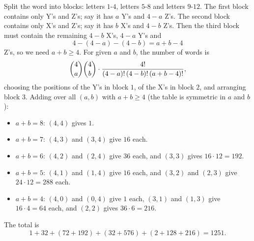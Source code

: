 Split the word into blocks: letters $1$-$4$, letters $5$-$8$ and letters $9$-$12$. The first block contains only Y's and Z's; say it has $a$ Y's and $4-a$ Z's. The second block contains only X's and Z's; say it has $b$ X's and $4-b$ Z's. Then the third block must contain the remaining $4-b$ X's, $4-a$ Y's and
\[4-(4-a)-(4-b)=a+b-4\]
Z's, so we need $a+b\ge4$. For given $a$ and $b$, the number of words is
\[\dbinom4a\dbinom4b\cdot\dfrac{4!}{(4-a)!\,(4-b)!\,(a+b-4)!},\]
choosing the positions of the Y's in block $1$, of the X's in block $2$, and arranging block $3$. Adding over all $(a,b)$ with $a+b\ge4$ (the table is symmetric in $a$ and $b$):
\begin{itemize}
\item $a+b=8$: $(4,4)$ gives $1$.
\item $a+b=7$: $(4,3)$ and $(3,4)$ give $16$ each.
\item $a+b=6$: $(4,2)$ and $(2,4)$ give $36$ each, and $(3,3)$ gives $16\cdot12=192$.
\item $a+b=5$: $(4,1)$ and $(1,4)$ give $16$ each, and $(3,2)$ and $(2,3)$ give $24\cdot12=288$ each.
\item $a+b=4$: $(4,0)$ and $(0,4)$ give $1$ each, $(3,1)$ and $(1,3)$ give $16\cdot4=64$ each, and $(2,2)$ gives $36\cdot6=216$.
\end{itemize}
The total is
\[1+32+(72+192)+(32+576)+(2+128+216)=\boxed{1251}.\]
